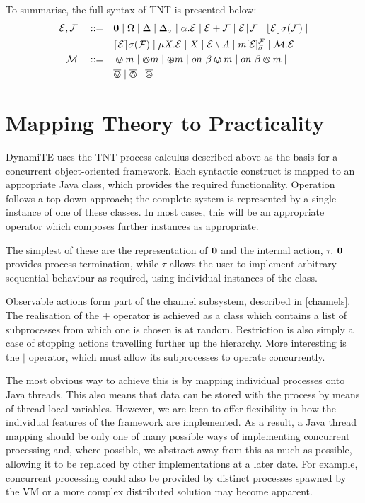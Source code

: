 \documentclass{acm_proc_article-sp}
\begin{document}
To summarise, the full syntax of TNT is presented below:
\begin{equation*}
  \begin{aligned}
    \text{$\mathcal{E}$}, \text{$\mathcal{F}$} \quad \mathrel{::=} \quad &
      \textbf{0}  \mid
      \Omega \mid
      \Delta \mid
      \Delta_{\sigma} \mid
      \alpha . \text{$\mathcal{E}$}  \mid
      \text{$\mathcal{E}$} + \text{$\mathcal{F}$} \mid
      \text{$\mathcal{E}$} \mathrel{\!|\!} \text{$\mathcal{F}$} \mid
      \lfloor{\text{$\mathcal{E}$}}\rfloor {\sigma} ({\text{$\mathcal{F}$}}) \mid \\
    & \lceil{\text{$\mathcal{E}$}}\rceil {\sigma} ({\text{$\mathcal{F}$}}) \mid 
      \mu X . \text{$\mathcal{E}$} \mid
      X \mid 
      \text{$\mathcal{E}$} \setminus {A} \mid
      {m}[ \text{$\mathcal{E}$} ]^{\text{$\mathcal{F}$}}_{\vec{\sigma}} \mid
      \text{$\mathcal{M}$} . \text{$\mathcal{E}$} \\
   \text{$\mathcal{M}$} \quad \mathrel{::=} \quad & \varovee m \mid \varowedge m \mid \varoast m \mid
      on\ \beta \varovee m \mid on\ \beta \varowedge m \mid \\
   & \overline{\varovee} \mid \overline{\varowedge} \mid \overline{\varoast}
   \end{aligned}
\end{equation*}

\section{Mapping Theory to Practicality}

DynamiTE uses the TNT process calculus described above as the basis for
a concurrent object-oriented framework.  Each syntactic construct is
mapped to an appropriate Java class, which provides the required
functionality.  Operation follows a top-down approach; the complete
system is represented by a single instance of one of these classes.  In
most cases, this will be an appropriate operator which composes further
instances as appropriate.

The simplest of these are the representation of $\textbf{0}$ and the internal
action, $\tau$.  $\textbf{0}$ provides process termination, while $\tau$
allows the user to implement arbitrary sequential behaviour as required,
using individual instances of the class.

Observable actions form part of the channel subsystem, described in
\ref{channels}.  The realisation of the $+$ operator is achieved as a
class which contains a list of subprocesses from which one is chosen is
at random.  Restriction is also simply a case of stopping actions
travelling further up the hierarchy.  More interesting is the $\mid$
operator, which must allow its subprocesses to operate concurrently.

The most obvious way to achieve this is by mapping individual processes
onto Java threads.  This also means that data can be stored with the
process by means of thread-local variables.  However, we are keen to
offer flexibility in how the individual features of the framework are
implemented.  As a result, a Java thread mapping should be only one of
many possible ways of implementing concurrent processing and, where
possible, we abstract away from this as much as possible, allowing it to
be replaced by other implementations at a later date.  For example,
concurrent processing could also be provided by distinct processes
spawned by the VM or a more complex distributed solution may become
apparent.
\end{document}
